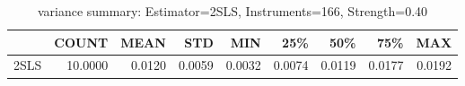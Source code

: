 \begin{table}[ht]
\centering
\caption{variance summary: Estimator=2SLS, Instruments=166, Strength=0.40}
\begin{tabular}{lrrrrrrrr}
\toprule
 & COUNT & MEAN & STD & MIN & 25\% & 50\% & 75\% & MAX \\
\midrule
2SLS & 10.0000 & 0.0120 & 0.0059 & 0.0032 & 0.0074 & 0.0119 & 0.0177 & 0.0192 \\
\bottomrule
\end{tabular}
\end{table}
